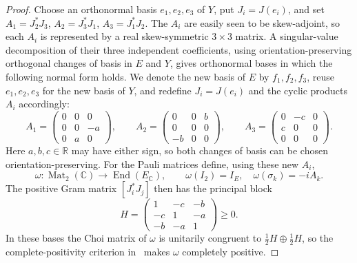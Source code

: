 \documentclass[11pt,onecolumn]{article}
\theoremstyle{blueplain}
\theoremstyle{bluedefinition}
\theoremstyle{bluedefinition}
\begin{document}
\begin{proof}
Choose an orthonormal basis $e_1,e_2,e_3$ of $Y$, put $J_i=J(e_i)$, and
set $A_1=J_2^*J_3$, $A_2=J_3^*J_1$, $A_3=J_1^*J_2$.  The $A_i$ are easily seen to be skew-adjoint, so 
each $A_i$ is represented by a real skew-symmetric $3\times3$ matrix.
A singular-value decomposition of their three independent
coefficients, using orientation-preserving orthogonal changes of basis
in $E$ and $Y$, gives orthonormal bases in which the following normal
form holds.  We denote the new basis of $E$ by $f_1,f_2,f_3$, reuse
$e_1,e_2,e_3$ for the new basis of $Y$, and redefine $J_i=J(e_i)$ and
the cyclic products $A_i$ accordingly:
\[
 A_1=\begin{pmatrix}0&0&0\\0&0&-a\\0&a&0\end{pmatrix},\qquad
 A_2=\begin{pmatrix}0&0&b\\0&0&0\\-b&0&0\end{pmatrix},\qquad
 A_3=\begin{pmatrix}0&-c&0\\c&0&0\\0&0&0\end{pmatrix}.
\]
Here $a,b,c\in\mathbb R$ may have either sign, so both changes of basis
can be chosen orientation-preserving.
For the Pauli matrices define, using these new $A_i$,
\[
 \omega\colon\operatorname{Mat}_2(\mathbb C)\to
 \operatorname{End}(E_{\mathbb C}),\qquad
 \omega(I_2)=I_E,\quad \omega(\sigma_k)=-iA_k.
\]
The positive Gram matrix $[J_i^*J_j]$ then has the principal block
\[
 H=\begin{pmatrix}1&-c&-b\\-c&1&-a\\-b&-a&1\end{pmatrix}\geqslant0.
\]
In these bases the Choi matrix of $\omega$ is unitarily congruent to
$\frac12H\oplus\frac12H$, so the complete-positivity criterion in~\cite{Choi} makes
$\omega$ completely positive.


\end{proof}
\end{document}
